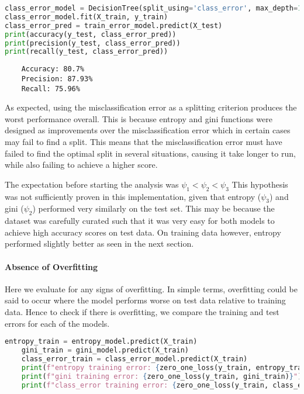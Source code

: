 \documentclass{article}
\begin{document}
\begin{lstlisting}[language=Python, caption=Misclassification error Tree]
class_error_model = DecisionTree(split_using='class_error', max_depth=10)
class_error_model.fit(X_train, y_train)
class_error_pred = train_error_model.predict(X_test)
print(accuracy(y_test, class_error_pred))
print(precision(y_test, class_error_pred))
print(recall(y_test, class_error_pred))
\end{lstlisting}

\begin{lstlisting}
    Accuracy: 80.7%
    Precision: 87.93%
    Recall: 75.96%
\end{lstlisting}

As expected, using the misclassification error as a splitting criterion produces the worst performance overall. This is because entropy and gini functions were designed as improvements over the misclassification error which in certain cases may fail to find a split. This means that the misclassification error must have failed to find the optimal split in several situations, causing it take longer to run, while also failing to achieve a higher score.

The expectation before starting the analysis was \(\psi_1 < \psi_2 < \psi_3 \)
This hypothesis was not sufficiently proven in this implementation, given that entropy (\(\psi_3\)) and gini (\(\psi_2\)) performed very similarly on the test set. This may be because the dataset was carefully curated such that it was very easy for both models to achieve high accuracy scores on test data. On training data however, entropy performed slightly better as seen in the next section.

\paragraph{Absence of Overfitting}

Here we evaluate for any signs of overfitting. In simple terms, overfitting could be said to occur where the model performs worse on test data relative to training data. Hence to check if there is overfitting, we compare the training and test errors for each of the models.

\begin{lstlisting}[language=Python, caption=Evaluating training errors]
    entropy_train = entropy_model.predict(X_train)
    gini_train = gini_model.predict(X_train)
    class_error_train = class_error_model.predict(X_train)
    print(f"entropy training error: {zero_one_loss(y_train, entropy_train)}")
    print(f"gini training error: {zero_one_loss(y_train, gini_train)}")
    print(f"class_error training error: {zero_one_loss(y_train, class_error_train)}")
\end{lstlisting}
\end{document}
